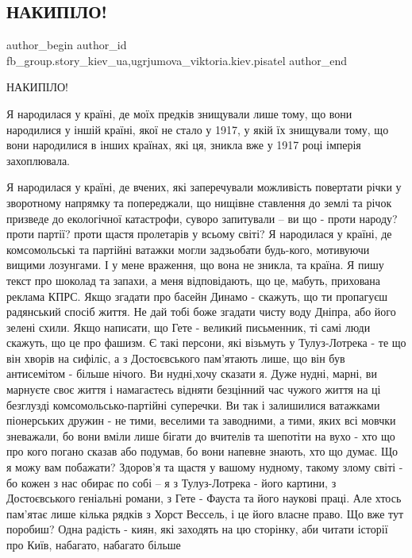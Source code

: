  
 
 
 
 
 
\subsection{НАКИПІЛО!}
\label{sec:27_11_2020.fb.fb_group.story_kiev_ua.1.nakipelo}
 
\ifcmt
 author_begin
   author_id fb_group.story_kiev_ua,ugrjumova_viktoria.kiev.pisatel
 author_end
\fi

НАКИПІЛО!

Я народилася у країні, де моїх предків знищували лише тому, що вони народилися
у іншій країні, якої не стало у 1917, у якій їх знищували тому, що вони
народилися в інших країнах, які ця, зникла вже у 1917 році імперія захоплювала.


Я народилася у країні, де вчених, які заперечували можливість повертати річки у
зворотному напрямку та попереджали, що нищівне ставлення до землі та річок
призведе до екологічної катастрофи, суворо запитували – ви що - проти народу?
проти партії? проти щастя пролетарів у всьому світі? Я народилася у країні, де
комсомольські та партійні ватажки могли задзьобати будь-кого, мотивуючи вищими
лозунгами. І у мене враження, що вона не зникла, та країна. Я пишу текст про
шоколад та запахи, а меня відповідають, що це, мабуть, прихована реклама КПРС.
Якщо згадати про басейн Динамо - скажуть, що ти пропагуєш радянський спосіб
життя. Не дай тобі боже згадати чисту воду Дніпра, або його зелені схили. Якщо
написати, що Гете - великий письменник, ті самі люди скажуть, що це про фашизм.
Є такі персони, які візьмуть у Тулуз-Лотрека - те що він хворів на сифіліс, а з
Достоєвського пам’ятають лише, що він був антисемітом - більше нічого. Ви
нудні,хочу сказати я. Дуже нудні, марні, ви марнуєте своє життя і намагаєтесь
відняти безцінний час чужого життя на ці безглузді комсомольсько-партійні
суперечки. Ви так і залишилися ватажками піонерських дружин - не тими, веселими
та заводними, а тими, яких всі мовчки зневажали, бо вони вміли лише бігати до
вчителів та шепотіти на вухо - хто що про кого погано сказав або подумав, бо
вони напевне знають, хто що думає. Що я можу вам побажати? Здоров’я та щастя у
вашому нудному, такому злому світі - бо кожен з нас обирає по собі – я з
Тулуз-Лотрека - його картини, з Достоєвського геніальні романи, з Гете - Фауста
та його наукові праці. Але хтось пам’ятає лише кілька рядків з Хорст Вессель, і
це його власне право. Що вже тут поробиш? Одна радість - киян, які заходять на
цю сторінку, аби читати історії про Київ, набагато, набагато більше

